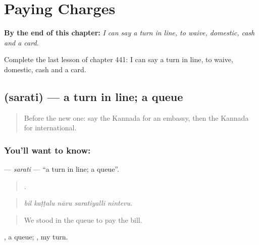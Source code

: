 
\chapter{Paying Charges}
\label{ch:ka-paying-charges}

\begin{chapteropening}
\textbf{By the end of this chapter:} \emph{I can say a turn in line, to waive, domestic, cash and a card.}

Complete the last lesson of chapter 441: I can say a turn in line, to waive, domestic, cash and a card.
\end{chapteropening}

\section[\texorpdfstring{\kn{ಸರತಿ} (sarati)}{ಸರತಿ (sarati)}]{ (sarati) — a turn in line; a queue}

\label{lesson:KA-C441-sarati}



\begin{quote}
Before the new one: say the Kannada for an embassy, then the Kannada for international.
\end{quote}

\subsection*{You'll want to know: }
\textbf{} — \emph{sarati} — \textquotedblleft{}a turn in line; a queue\textquotedblright{}.

\begin{quote}
    .
\end{quote}

\begin{quote}
\emph{bil kaṭṭalu nāvu saratiyalli nintevu.}
\end{quote}

\begin{quote}
We stood in the queue to pay the bill.
\end{quote}

 , a queue;  , my turn.

